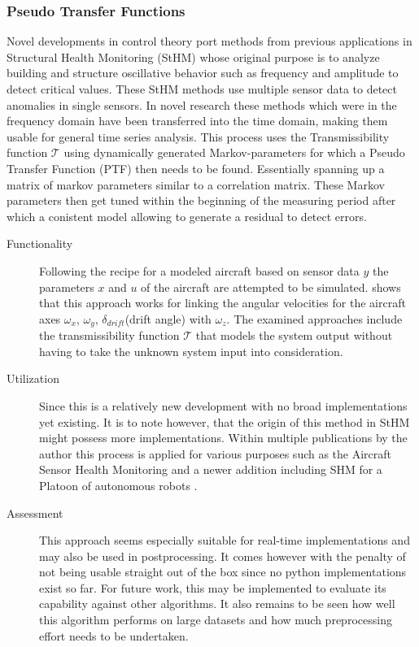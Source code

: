 \subsubsection{Pseudo Transfer Functions}


Novel developments in control theory port methods from previous applications in Structural Health Monitoring (StHM) whose original purpose is to analyze building and structure oscillative behavior such as frequency and amplitude to detect critical values. These StHM methods use multiple sensor data to detect anomalies in single sensors. In novel research these methods which were in the frequency domain have been transferred into the time domain, making them usable for general time series analysis. This process uses the Transmissibility function $\mathcal{T}$ using dynamically generated Markov-parameters for which a Pseudo Transfer Function (PTF) then needs to be found. Essentially spanning up a matrix of markov parameters similar to a correlation matrix. These Markov parameters then get tuned within the beginning of the measuring period after which a conistent model allowing to generate a residual to detect errors. \cite{khalil_transmissibility-based_2022, khalil_transmissibility-based_2022-1, wolter_anwendung_2014}

\begin{description}

    \item[Functionality]\hfill

    Following the recipe for a modeled aircraft based on sensor data $y$ the parameters $x$ and $u$ of the aircraft are attempted to be simulated. \textcite{aljanaideh_aircraft_2015} shows that this approach works for linking the angular velocities for the aircraft axes $\omega_x$, $\omega_y$, $\delta_{drift}$(drift angle) with $\omega_z$. The examined approaches include the transmissibility function $\mathcal{T}$ that models the system output without having to take the unknown system input into consideration.


    \item[Utilization]\hfill

    Since this is a relatively new development with no broad implementations yet existing. It is to note however, that the origin of this method in StHM might possess more implementations. Within multiple publications by the author this process is applied for various purposes such as the Aircraft Sensor Health Monitoring \cite{aljanaideh_aircraft_2015} and a newer addition including SHM for a Platoon of autonomous robots \cite{khalil_transmissibility-based_2022}.

    \item[Assessment]\hfill

    This approach seems especially suitable for real-time implementations and may also be used in postprocessing. It comes however with the penalty of not being usable straight out of the box since no python implementations exist so far. For future work, this may be implemented to evaluate its capability against other algorithms. It also remains to be seen how well this algorithm performs on large datasets and how much preprocessing effort needs to be undertaken.
\end{description}


